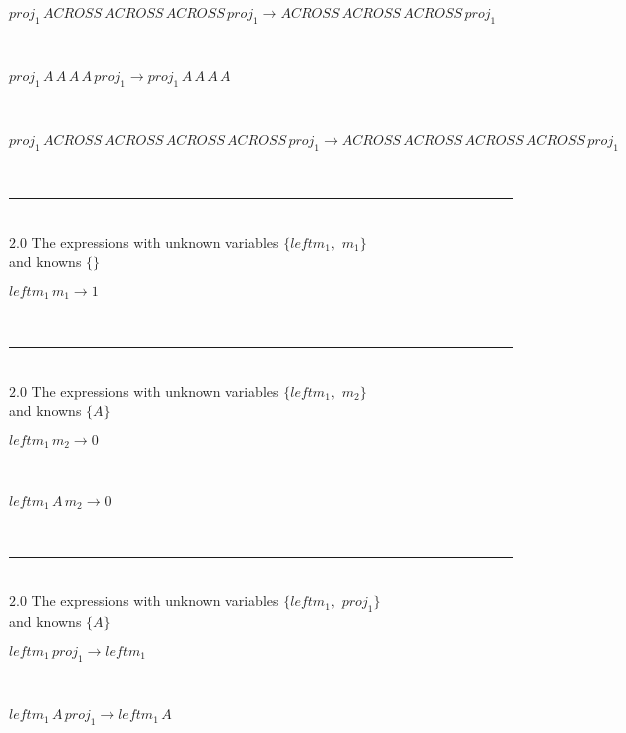 \documentclass[rep10,leqno]{report}
\begin{document}
\begin{minipage}{6in}
$
proj_{1}\,
 ACROSS\,
 ACROSS\,
 ACROSS\,
 proj_{1}\rightarrow ACROSS\,
 ACROSS\,
 ACROSS\,
 proj_{1}
$
\end{minipage}\medskip \\
\begin{minipage}{6in}
$
proj_{1}\,
 A\,
 A\,
 A\,
 A\,
 proj_{1}\rightarrow proj_{1}\,
 A\,
 A\,
 A\,
 A
$
\end{minipage}\medskip \\
\begin{minipage}{6in}
$
proj_{1}\,
 ACROSS\,
 ACROSS\,
 ACROSS\,
 ACROSS\,
 proj_{1}\rightarrow ACROSS\,
 ACROSS\,
 ACROSS\,
 ACROSS\,
 proj_{1}
$
\end{minipage}\\
\rule[3pt]{6in}{.7pt}\\
$2.0$  The expressions with unknown variables $\{leftm_{1},
$ $
m_{1}\}$\\
and knowns $\{\}$\smallskip\\
\begin{minipage}{6in}
$
leftm_{1}\,
 m_{1}\rightarrow 1
$
\end{minipage}\\
\rule[3pt]{6in}{.7pt}\\
$2.0$  The expressions with unknown variables $\{leftm_{1},
$ $
m_{2}\}$\\
and knowns $\{A\}$\smallskip\\
\begin{minipage}{6in}
$
leftm_{1}\,
 m_{2}\rightarrow 0
$
\end{minipage}\medskip \\
\begin{minipage}{6in}
$
leftm_{1}\,
 A\,
 m_{2}\rightarrow 0
$
\end{minipage}\\
\rule[3pt]{6in}{.7pt}\\
$2.0$  The expressions with unknown variables $\{leftm_{1},
$ $
proj_{1}\}$\\
and knowns $\{A\}$\smallskip\\
\begin{minipage}{6in}
$
leftm_{1}\,
 proj_{1}\rightarrow leftm_{1}
$
\end{minipage}\medskip \\
\begin{minipage}{6in}
$
leftm_{1}\,
 A\,
 proj_{1}\rightarrow leftm_{1}\,
 A
$
\end{minipage}\medskip \\
\end{document}
